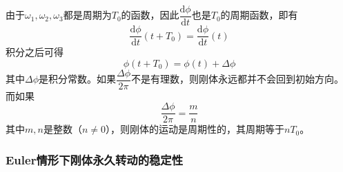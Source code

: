 由于$\omega_1,\omega_2,\omega_3$都是周期为$T_0$的函数，因此$\dfrac{\mathrm{d}\phi}{\mathrm{d}t}$也是$T_0$的周期函数，即有
\begin{equation*}
	\dfrac{\mathrm{d}\phi}{\mathrm{d}t}(t+T_0)=\dfrac{\mathrm{d}\phi}{\mathrm{d}t}(t)
\end{equation*}
积分之后可得
\begin{equation}
	\phi(t+T_0)=\phi(t)+\Delta\phi
\end{equation}
其中$\Delta\phi$是积分常数。如果$\dfrac{\Delta\phi}{2\pi}$不是有理数，则刚体永远都并不会回到初始方向。而如果
\begin{equation*}
	\dfrac{\Delta\phi}{2\pi} = \frac mn
\end{equation*}
其中$m,n$是整数（$n\neq 0$），则刚体的运动是周期性的，其周期等于$nT_0$。


\subsubsection{Euler情形下刚体永久转动的稳定性}\label{chapter6:subsubsection-Euler情形下刚体永久转动的稳定性}

